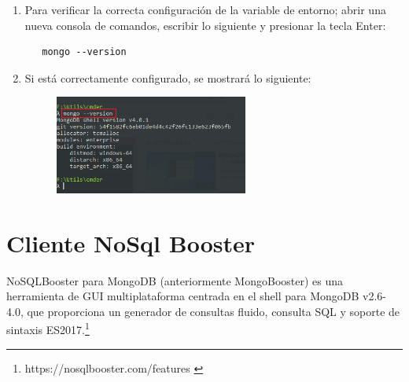 \documentclass[a4paper,11pt]{paper}
\begin{document}
\begin{enumerate}
\begin{verbatim}
   setx PATH /m "%path%;C:\Program Files\MongoDB\Server\4.0\bin"
\end{verbatim}

\item
  Para verificar la correcta configuración de la variable de entorno;
  abrir una nueva consola de comandos, escribir lo siguiente y presionar la
  tecla Enter:
\begin{verbatim}
   mongo --version
\end{verbatim}


\item
  Si está correctamente configurado, se mostrará lo siguiente:

  \begin{figure}[!h]
  \centering
  \includegraphics[width=0.6\textwidth]{imgs/instalacion/MongoVersion.png}
  \end{figure}
\end{enumerate}

\newpage
\section{Cliente NoSql Booster}

NoSQLBooster para MongoDB (anteriormente MongoBooster) es una herramienta de GUI multiplataforma centrada en el shell para MongoDB v2.6-4.0, que proporciona un generador de consultas fluido, consulta SQL y soporte de sintaxis ES2017.\footnote{https://nosqlbooster.com/features \cite{booster}}
\end{document}
